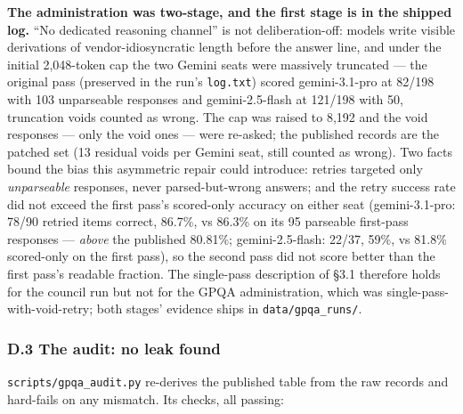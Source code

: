 \textbf{The administration was two-stage, and the first stage is in the shipped log.} ``No dedicated reasoning channel'' is not deliberation-off: models write visible derivations of vendor-idiosyncratic length before the answer line, and under the initial 2,048-token cap the two Gemini seats were massively truncated --- the original pass (preserved in the run's \texttt{log.txt}) scored gemini-3.1-pro at 82/198 with 103 unparseable responses and gemini-2.5-flash at 121/198 with 50, truncation voids counted as wrong. The cap was raised to 8,192 and the void responses --- only the void ones --- were re-asked; the published records are the patched set (13 residual voids per Gemini seat, still counted as wrong). Two facts bound the bias this asymmetric repair could introduce: retries targeted only \emph{unparseable} responses, never parsed-but-wrong answers; and the retry success rate did not exceed the first pass's scored-only accuracy on either seat (gemini-3.1-pro: 78/90 retried items correct, 86.7\%, vs 86.3\% on its 95 parseable first-pass responses --- \emph{above} the published 80.81\%; gemini-2.5-flash: 22/37, 59\%, vs 81.8\% scored-only on the first pass), so the second pass did not score better than the first pass's readable fraction. The single-pass description of §3.1 therefore holds for the council run but not for the GPQA administration, which was single-pass-with-void-retry; both stages' evidence ships in \texttt{data/gpqa\_runs/}.

\subsubsection{D.3 The audit: no leak found}\label{d.3-the-audit-no-leak-found}

\texttt{scripts/gpqa\_audit.py} re-derives the published table from the raw records and hard-fails on any mismatch. Its checks, all passing:

